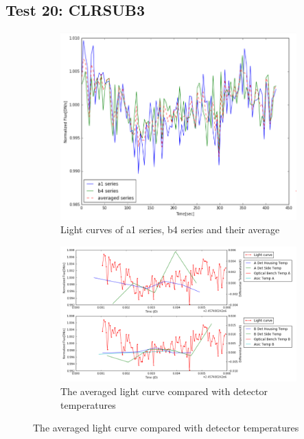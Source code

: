 \documentclass{aastex6}
\begin{document}
\subsection{Test 20: CLRSUB3} 
\begin{figure}[H]
    \centering
    \begin{subfigure}{1}
        \includegraphics[scale=0.4]{ts_test20}
        \caption{Light curves of a1 series, b4 series and their average}
    \end{subfigure}

    \begin{subfigure}{2}
        \includegraphics[scale=0.4]{temp_test20}
        \caption{The averaged light curve compared with detector temperatures}
    \end{subfigure}
   

\end{figure}
\end{document}
